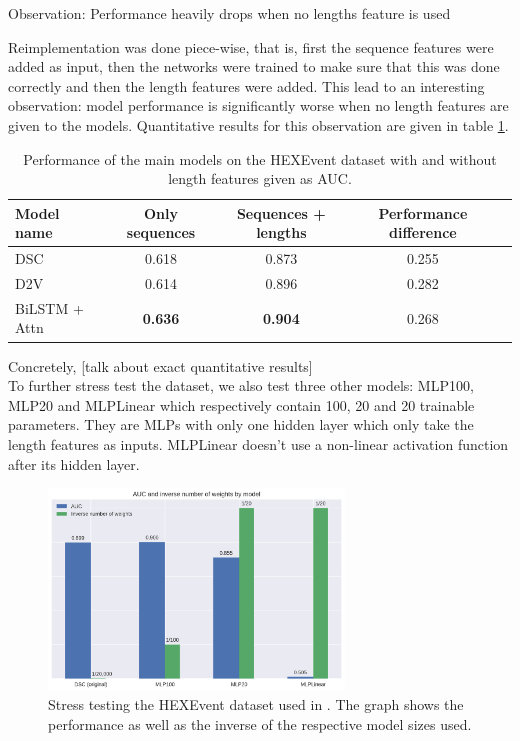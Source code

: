 
Observation: Performance heavily drops when no lengths feature is used


Reimplementation was done piece-wise, that is, first the sequence features were added as input, then the networks were trained to make sure that this was done correctly and then the length features were added. This lead to an interesting observation: model performance is significantly worse when no length features are given to the models. Quantitative results for this observation are given in table \ref{table:results_hexevent}.


\begin{table}[h!]
	\centering
	\begin{tabular}{| l | c | c | c| c} 
		\hline
		Model name & Only sequences & Sequences + lengths & Performance difference\\
		\hline
		DSC & 0.618 & 0.873 & 0.255\\
		D2V & 0.614 & 0.896 & 0.282\\
		BiLSTM + Attn & \textbf{0.636} & \textbf{0.904} & 0.268\\
		\hline
	\end{tabular}
	\caption{Performance of the main models on the HEXEvent dataset with and without length features given as AUC.  
	}
	\label{table:results_hexevent}
\end{table}


Concretely, [talk about exact quantitative results]\\


To further stress test the dataset, we also test three other models: MLP100, MLP20 and MLPLinear which respectively contain 100, 20 and 20 trainable parameters. They are MLPs with only one hidden layer which only take the length features as inputs. MLPLinear doesn't use a non-linear activation function after its hidden layer.


\begin{figure}
	\centering\includegraphics[width=0.7\textwidth]{../visualizations/dsc_funeral_barchart.png} 
	\caption[bla.]{Stress testing the HEXEvent dataset used in \cite{dsc}. The graph shows the performance as well as the inverse of the respective model sizes used.}
	\label{fig:dsc_funeral}
\end{figure}


